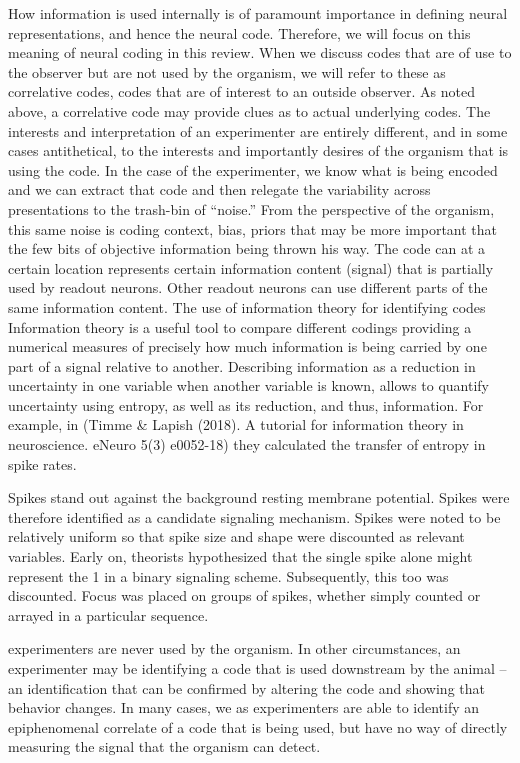 \documentclass[12pt]{article}
\begin{document}
How information is used internally is of paramount importance in defining neural representations, and hence the neural code. Therefore, we will focus on this meaning of neural
coding in this review. When we discuss codes that are of use to the observer but are not used by the organism, we will refer to these as correlative codes, codes that are of
interest to an outside observer. As noted above, a correlative code may provide clues as to actual underlying codes. The interests and interpretation of an experimenter are
entirely different, and in some cases antithetical, to the interests and importantly desires of the organism that is using the code. In the case of the experimenter, we know
what is being encoded and we can extract that code and then relegate the variability across presentations to the trash-bin of “noise.” From the perspective of the organism,
this same noise is coding context, bias, priors that may be more important that the few bits of objective information being thrown his way. The code can at a certain location
represents certain information content (signal) that is partially used by readout neurons. Other readout neurons can use different parts of the same information content.
The use of information theory for identifying codes
Information theory is a useful tool to compare different codings providing a numerical measures of precisely how much information is being carried by one part of a signal
relative to another. Describing information as a reduction in uncertainty in one variable when another variable is known, allows to quantify uncertainty using entropy, as well
as its reduction, and thus, information. For example, in (Timme \& Lapish (2018). A tutorial for information theory in neuroscience. eNeuro 5(3) e0052-18) they calculated the
transfer of entropy in spike rates.

Spikes stand out against the background resting membrane potential. Spikes were therefore identified as a candidate signaling mechanism. 
Spikes were noted to be relatively uniform so that spike size and shape were discounted as relevant variables. Early on, theorists hypothesized
that the single spike alone might represent the 1 in a binary signaling scheme. Subsequently, this too was discounted. Focus was placed on groups of spikes, whether simply
counted or arrayed in a particular sequence. 

experimenters are never used by the organism. In other circumstances, an experimenter may be identifying a code that is used downstream by the animal -- an identification that
can be confirmed by altering the code and showing that behavior changes. In many cases, we as experimenters are able to identify an epiphenomenal correlate of a code that is
being used, but have no way of directly measuring the signal that the organism can detect.
\end{document}
